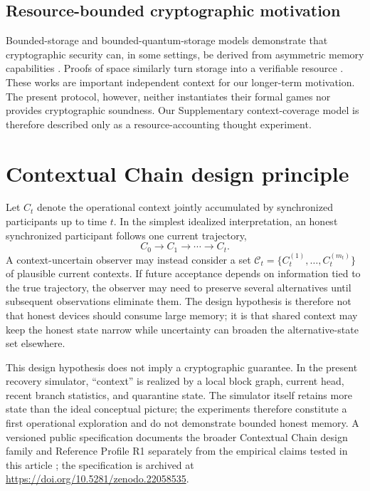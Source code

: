 \documentclass[11pt]{article}
\begin{document}
\subsection{Resource-bounded cryptographic motivation}
Bounded-storage and bounded-quantum-storage models demonstrate that cryptographic security can, in some settings, be derived from asymmetric memory capabilities \cite{Damgard2008BQSM,Dodis2022Authentication}. Proofs of space similarly turn storage into a verifiable resource \cite{Dziembowski2015ProofsSpace}. These works are important independent context for our longer-term motivation. The present protocol, however, neither instantiates their formal games nor provides cryptographic soundness. Our Supplementary context-coverage model is therefore described only as a resource-accounting thought experiment.

\section{Contextual Chain design principle}
Let $C_t$ denote the operational context jointly accumulated by synchronized participants up to time $t$. In the simplest idealized interpretation, an honest synchronized participant follows one current trajectory,
\[
C_0 \rightarrow C_1 \rightarrow \cdots \rightarrow C_t.
\]
A context-uncertain observer may instead consider a set $\mathcal{C}_t=\{C_t^{(1)},\ldots,C_t^{(m_t)}\}$ of plausible current contexts. If future acceptance depends on information tied to the true trajectory, the observer may need to preserve several alternatives until subsequent observations eliminate them. The design hypothesis is therefore not that honest devices should consume large memory; it is that shared context may keep the honest state narrow while uncertainty can broaden the alternative-state set elsewhere.

This design hypothesis does not imply a cryptographic guarantee. In the present recovery simulator, ``context'' is realized by a local block graph, current head, recent branch statistics, and quarantine state. The simulator itself retains more state than the ideal conceptual picture; the experiments therefore constitute a first operational exploration and do not demonstrate bounded honest memory.
A versioned public specification documents the broader Contextual Chain design family and Reference Profile R1 separately from the empirical claims tested in this article \cite{KimContextualChainSpec2026}; the specification is archived at \url{https://doi.org/10.5281/zenodo.22058535}.
\end{document}
